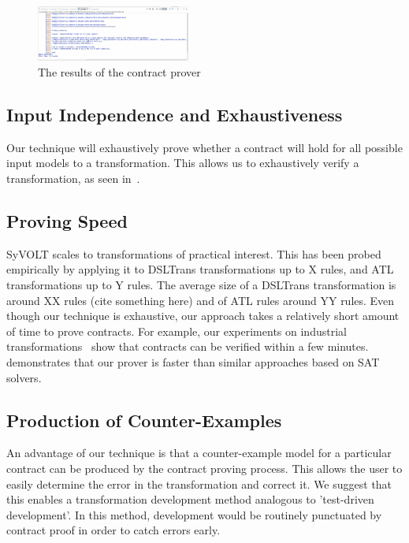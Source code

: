 \begin{figure}
\centering
\includegraphics[width=0.45\textwidth]{figures/output}
\caption{The results of the contract prover}
\label{fig:output}
\end{figure}

\subsection{Input Independence and Exhaustiveness}

Our technique will exhaustively prove whether a contract will hold for all
possible input models to a transformation. This allows us to exhaustively verify
a transformation, as seen in~\cite{Lucio2014}.

\subsection{Proving Speed}

SyVOLT scales to transformations of practical interest. This has been probed
empirically by applying it to DSLTrans transformations up to X rules, and ATL
transformations up to Y rules. The average size of a DSLTrans transformation is
around XX rules (cite something here) and of ATL rules around YY rules. Even
though our technique is exhaustive, our approach takes a relatively short amount
of time to prove contracts. For example, our experiments on industrial
transformations~\cite{Oakes} show that contracts can be verified within a few
minutes. \cite{Selim2014} demonstrates that our prover is faster than similar
approaches based on SAT solvers.

\subsection{Production of Counter-Examples}

An advantage of our technique is that a counter-example model for a particular
contract can be produced by the contract proving process. This allows the user
to easily determine the error in the transformation and correct it. We suggest
that this enables a transformation development method analogous to 'test-driven
development'. In this method, development would be routinely punctuated by
contract proof in order to catch errors early.

 